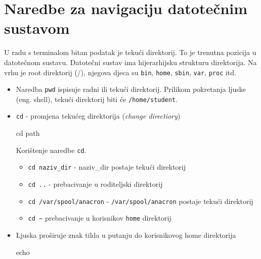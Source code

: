 \newcommand{\sitosig}[2]{\textcolor{dark-blue}{\texttt{/#1}\texttt{\ ::\ }{\texttt{#2}/}}}

\section{Naredbe za navigaciju datotečnim sustavom}
U radu s terminalom bitan podatak je tekući direktorij. To je trenutna pozicija u datotečnom sustavu.
Datotečni sustav ima hijerarhijsku strukturu direktorija. Na vrhu je root direktorij (/), njegova djeca su \texttt{bin}, \texttt{home}, \texttt{sbin}, \texttt{var}, \texttt{proc} itd.
\begin{itemize}
\item Naredba \texttt{pwd} ispisuje radni ili tekući direktorij. Prilikom pokretanja ljuske (eng. shell), tekući direktorij biti će \texttt{/home/student}.
\item \texttt{cd} - promjena tekućeg direktorija (\textit{change directiory})
\begin{prototip}
cd path
\end{prototip}

\begin{primjer} Korištenje naredbe \texttt{cd}.
\begin{itemize}
\item \texttt{cd naziv\_dir} - naziv\_dir postaje tekući direktorij
\item \texttt{cd ..} - prebacivanje u roditeljski direktorij
\item \texttt{cd /var/spool/anacron} -  \texttt{/var/spool/anacron} postaje tekući direktorij
\item \texttt{cd \~} prebacivanje u korisnikov \texttt{home} direktorij
\end{itemize}
\end{primjer}

\item Ljuska proširuje znak tilda u putanju do korisnikovog home direktorija

\begin{prototip}
echo ~
\end{prototip}


\end{itemize}
